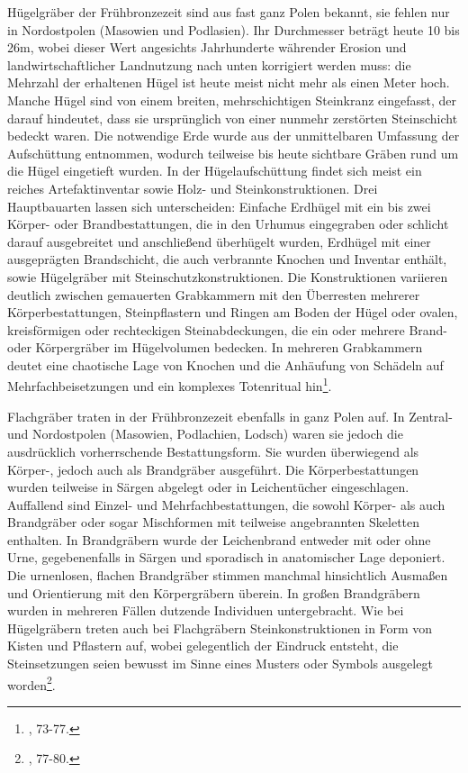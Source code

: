 \documentclass[openany,twoside,twocolumn]{book}
\let\rmarkdownfootnote\footnote%
\def\footnote{\protect\rmarkdownfootnote}
\begin{document}
Hügelgräber der Frühbronzezeit sind aus fast ganz Polen bekannt, sie
fehlen nur in Nordostpolen (Masowien und Podlasien). Ihr Durchmesser
beträgt heute 10 bis 26m, wobei dieser Wert angesichts Jahrhunderte
währender Erosion und landwirtschaftlicher Landnutzung nach unten
korrigiert werden muss: die Mehrzahl der erhaltenen Hügel ist heute
meist nicht mehr als einen Meter hoch. Manche Hügel sind von einem
breiten, mehrschichtigen Steinkranz eingefasst, der darauf hindeutet,
dass sie ursprünglich von einer nunmehr zerstörten Steinschicht bedeckt
waren. Die notwendige Erde wurde aus der unmittelbaren Umfassung der
Aufschüttung entnommen, wodurch teilweise bis heute sichtbare Gräben
rund um die Hügel eingetieft wurden. In der Hügelaufschüttung findet
sich meist ein reiches Artefaktinventar sowie Holz- und
Steinkonstruktionen. Drei Hauptbauarten lassen sich unterscheiden:
Einfache Erdhügel mit ein bis zwei Körper- oder Brandbestattungen, die
in den Urhumus eingegraben oder schlicht darauf ausgebreitet und
anschließend überhügelt wurden, Erdhügel mit einer ausgeprägten
Brandschicht, die auch verbrannte Knochen und Inventar enthält, sowie
Hügelgräber mit Steinschutzkonstruktionen. Die Konstruktionen variieren
deutlich zwischen gemauerten Grabkammern mit den Überresten mehrerer
Körperbestattungen, Steinpflastern und Ringen am Boden der Hügel oder
ovalen, kreisförmigen oder rechteckigen Steinabdeckungen, die ein oder
mehrere Brand- oder Körpergräber im Hügelvolumen bedecken. In mehreren
Grabkammern deutet eine chaotische Lage von Knochen und die Anhäufung
von Schädeln auf Mehrfachbeisetzungen und ein komplexes Totenritual
hin\footnote{\textcite{dabrowski_aeltere_2004}, 73-77.}.

Flachgräber traten in der Frühbronzezeit ebenfalls in ganz Polen auf. In
Zentral- und Nordostpolen (Masowien, Podlachien, Lodsch) waren sie
jedoch die ausdrücklich vorherrschende Bestattungsform. Sie wurden
überwiegend als Körper-, jedoch auch als Brandgräber ausgeführt. Die
Körperbestattungen wurden teilweise in Särgen abgelegt oder in
Leichentücher eingeschlagen. Auffallend sind Einzel- und
Mehrfachbestattungen, die sowohl Körper- als auch Brandgräber oder sogar
Mischformen mit teilweise angebrannten Skeletten enthalten. In
Brandgräbern wurde der Leichenbrand entweder mit oder ohne Urne,
gegebenenfalls in Särgen und sporadisch in anatomischer Lage deponiert.
Die urnenlosen, flachen Brandgräber stimmen manchmal hinsichtlich
Ausmaßen und Orientierung mit den Körpergräbern überein. In großen
Brandgräbern wurden in mehreren Fällen dutzende Individuen
untergebracht. Wie bei Hügelgräbern treten auch bei Flachgräbern
Steinkonstruktionen in Form von Kisten und Pflastern auf, wobei
gelegentlich der Eindruck entsteht, die Steinsetzungen seien bewusst im
Sinne eines Musters oder Symbols ausgelegt worden\footnote{\textcite{dabrowski_aeltere_2004},
  77-80.}.
\end{document}
